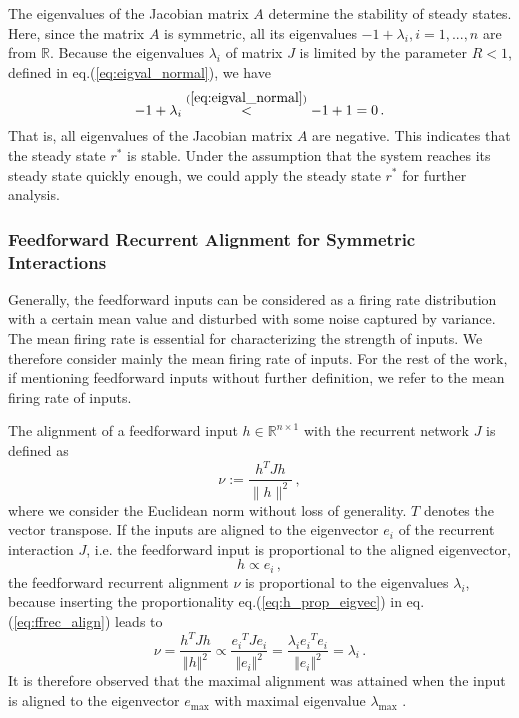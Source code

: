 \documentclass[11pt]{article}
\begin{document}
	The eigenvalues of the Jacobian matrix $A$ determine the stability of steady states. Here, since the matrix $A$ is symmetric, all its eigenvalues $-1 + \lambda_i, i = 1, ..., n$ are from $\mathbb{R}$. Because the eigenvalues $\lambda_i$ of matrix $J$ is limited by the parameter $R<1$, defined in eq.(\ref{eq:eigval_normal}), we have 
		\begin{equation} \label{eq:sym_stable_fix_point}
			-1 + \lambda_i \overset{(\ref{eq:eigval_normal})}{<} -1 + 1 = 0 \, .
		\end{equation}
	That is, all eigenvalues of the Jacobian matrix $A$ are negative. This indicates that the steady state $r^*$ is stable. Under the assumption that the system reaches its steady state quickly enough, we could apply the steady state $r^*$ for further analysis. 
	
	\subsubsection{Feedforward Recurrent Alignment for Symmetric Interactions} \label{sec:ffrec_definition}
	Generally, the feedforward inputs can be considered as a firing rate distribution with a certain mean value and disturbed with some noise captured by variance. The mean firing rate is essential for characterizing the strength of inputs. We therefore consider mainly the mean firing rate of inputs. For the rest of the work, if mentioning feedforward inputs without further definition, we refer to the mean firing rate of inputs. 
	
	The alignment of a feedforward input $h \in \mathbb{R}^{n \times 1}$ with the recurrent network $J$ is defined as \cite{tragenap2023nature}
		\begin{equation} \label{eq:ffrec_align}
			\nu := \frac{h^T J h}{\parallel h \parallel ^2}\, ,
		\end{equation}	
	where we consider the Euclidean norm without loss of generality. $T$ denotes the vector transpose. 
	If the inputs are aligned to the eigenvector $e_i$ of the recurrent interaction $J$, i.e. the feedforward input is proportional to the aligned eigenvector, 
		\begin{equation} \label{eq:h_prop_eigvec}
			h \propto e_i  \, ,
		\end{equation}
	the feedforward recurrent alignment $\nu$ is proportional to the eigenvalues $\lambda_i$, because inserting the proportionality eq.(\ref{eq:h_prop_eigvec}) in eq.(\ref{eq:ffrec_align}) leads to
		\begin{equation} \label{eq:ffrec_equals_eigval}
			\nu = \frac{h^T J h}{\Vert h \Vert ^2} \propto \frac{{e_i}^T J e_i}{\Vert e_i \Vert^2} = \frac{\lambda_i {e_i}^T e_i}{\Vert e_i \Vert ^2} = \lambda_i \, .
		\end{equation}
	It is therefore observed that the maximal alignment was attained when the input is aligned to the eigenvector $e_{\text{max}}$ with maximal eigenvalue $\lambda_{\text{max}}$ \cite{tragenap2023nature}. 
	
\end{document}
